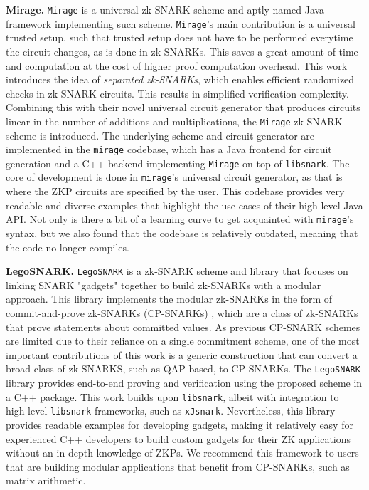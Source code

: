 \textbf{Mirage.}
\texttt{Mirage} \cite{kosba2020mirage} is a universal zk-SNARK scheme and aptly named Java framework \cite{Mirage} implementing such scheme. \texttt{Mirage}'s main contribution is a universal trusted setup, such that trusted setup does not have to be performed everytime the circuit changes, as is done in zk-SNARKs. This saves a great amount of time and computation at the cost of higher proof computation overhead. This work introduces the idea of \textit{separated zk-SNARKs}, which enables efficient randomized checks in zk-SNARK circuits. This results in simplified verification complexity. Combining this with their novel universal circuit generator that produces circuits linear in the number of additions and multiplications, the \texttt{Mirage} zk-SNARK scheme is introduced. The underlying scheme and circuit generator are implemented in the \texttt{mirage} codebase, which has a Java frontend for circuit generation and a C++ backend implementing \texttt{Mirage} on top of \texttt{libsnark}. The core of development is done in \texttt{mirage}'s universal circuit generator, as that is where the ZKP circuits are specified by the user. This codebase provides very readable and diverse examples that highlight the use cases of their high-level Java API. 
Not only is there a bit of a learning curve to get acquainted with \texttt{mirage}'s syntax, but we also found that the codebase is relatively outdated, meaning that the code no longer compiles.

\textbf{LegoSNARK.} 
\texttt{LegoSNARK} \cite{campanelli2019legosnark} is a zk-SNARK scheme and library that focuses on linking SNARK "gadgets" together to build zk-SNARKs with a modular approach. This library implements the modular zk-SNARKs in the form of commit-and-prove zk-SNARKs (CP-SNARKs) \cite{lipmaa2016prover}, which are a class of zk-SNARKs that prove statements about committed values. As previous CP-SNARK schemes are limited due to their reliance on a single commitment scheme, one of the most important contributions of this work is a generic construction that can convert a broad class of zk-SNARKS, such as QAP-based, to CP-SNARKs. The \texttt{LegoSNARK} library \cite{legosnark} provides end-to-end proving and verification using the proposed scheme in a C++ package. This work builds upon \texttt{libsnark}, albeit with integration to high-level \texttt{libsnark} frameworks, such as \texttt{xJsnark}. Nevertheless, this library provides readable examples for developing gadgets, making it relatively easy for experienced C++ developers to build custom gadgets for their ZK applications without an in-depth knowledge of ZKPs. We recommend this framework to users that are building modular applications that benefit from CP-SNARKs, such as matrix arithmetic.


